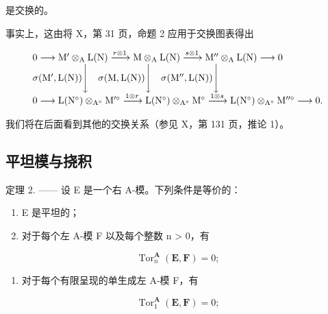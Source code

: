 是交换的。

事实上，这由将 X，第 31 页，命题 2 应用于交换图表得出

\[
\begin{array}{l} 0 \longrightarrow \mathrm{M} ^ {\prime} \otimes_ {\mathrm{A}} \mathrm{L} (\mathrm{N}) \xrightarrow {r \otimes 1} \mathrm{M} \otimes_ {\mathrm{A}} \mathrm{L} (\mathrm{N}) \xrightarrow {s \otimes 1} \mathrm{M} ^ {\prime \prime} \otimes_ {\mathrm{A}} \mathrm{L} (\mathrm{N}) \longrightarrow 0 \\ \sigma (\mathrm{M} ^ {\prime}, \mathrm{L} (\mathrm{N})) \Biggl \downarrow \quad \sigma (\mathrm{M}, \mathrm{L} (\mathrm{N})) \Biggl \downarrow \quad \sigma (\mathrm{M} ^ {\prime \prime}, \mathrm{L} (\mathrm{N})) \Biggl \downarrow \\ 0 \longrightarrow \mathrm{L} (\mathrm{N} ^ {\circ}) \otimes_ {\mathrm{A} ^ {\circ}} \mathrm{M} ^ {\prime \circ} \xrightarrow {1 \otimes r} \mathrm{L} (\mathrm{N} ^ {\circ}) \otimes_ {\mathrm{A} ^ {\circ}} \mathrm{M} ^ {\circ} \xrightarrow {1 \otimes s} \mathrm{L} (\mathrm{N} ^ {\circ}) \otimes_ {\mathrm{A} ^ {\circ}} \mathrm{M} ^ {\prime \prime \circ} \longrightarrow 0. \end{array}
\]

我们将在后面看到其他的交换关系（参见 X，第 131 页，推论 1）。

\subsection{平坦模与挠积}

定理 2. —— 设 E 是一个右 A-模。下列条件是等价的：

\begin{enumerate}
\def\labelenumi{(\roman{enumi})}
\item
  E 是平坦的；
\item
  对于每个左 A-模 F 以及每个整数 n \textgreater{} 0，有
\end{enumerate}

\[
\operatorname{Tor} _ {n} ^ {\mathbf {A}} (\mathbf {E}, \mathbf {F}) = 0;
\]

\begin{enumerate}
\def\labelenumi{(\roman{enumi})}
\setcounter{enumi}{2}
\tightlist
\item
  对于每个有限呈现的单生成左 A-模 F，有
\end{enumerate}

\[
\operatorname{Tor} _ {1} ^ {\mathbf {A}} (\mathbf {E}, \mathbf {F}) = 0;
\]

